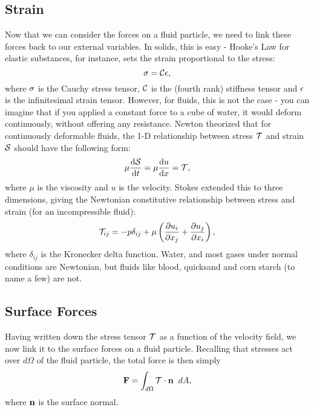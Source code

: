 \subsection{Strain}
Now that we can consider the forces on a fluid particle, we need to link these forces back to our external variables. In solids, this is easy - Hooke's Law for elastic substances, for instance, sets the strain proportional to the stress:
\begin{equation}
\mathbf{\sigma} = \mathcal{C}\mathbf{\epsilon},
\end{equation}
where $\mathbf{\sigma}$ is the Cauchy stress tensor, $\mathcal{C}$ is the (fourth rank) stiffness tensor and $\mathbf{\epsilon}$ is the infinitesimal strain tensor. However, for fluids, this is not the case - you can imagine that if you applied a constant force to a cube of water, it would deform continuously, without offering any resistance. Newton theorized that for continuously deformable fluids, the 1-D relationship between stress $\mathcal{T}$ and strain $\mathcal{S}$ should have the following form:
\begin{equation}
\mu \der{1}{\Tensor{S}}{t} = \mu \der{1}{u}{x}=\Tensor{T}, 
\end{equation}
where $\mu$ is the viscosity and $u$ is the velocity.  Stokes extended this to three dimensions, giving the Newtonian constitutive relationship between stress and strain (for an incompressible fluid):
\begin{equation}\label{eq:constitutive}
\Tensor{T}_{ij} = -p\delta_{ij} + \mu\paren{\pder{1}{u_{i}}{x_j} + \pder{1}{u_j}{x_i}},
\end{equation}
where $\delta_{ij}$ is the Kronecker delta function. Water, and most gases under normal conditions are Newtonian, but fluids like blood, quicksand and corn starch (to name a few) are not. 

\subsection{Surface Forces}
Having written down the stress tensor $\mathcal{T}$ as a function of the velocity field, we now link it to the surface forces on a fluid particle. Recalling that stresses act over $d\Omega$ of the fluid particle, the total force is then simply 
\begin{equation}\label{eq:surfaceForce}
\Vector{F} = \int{d\Omega}{}{\Tensor{T}\cdot\Vector{n}}{dA},
\end{equation}
where $\mathbf{n}$ is the surface normal. 

